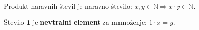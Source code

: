 \begin{frame}
\begin{block}{}
\begin{figure}
            \end{figure}

            \end{block}


            \begin{block}{}
                Produkt naravnih števil je naravno število: $x, y \in \mathbb{N} \Rightarrow x\cdot y \in \mathbb{N}$.

            \end{block}

            \begin{block}{}
                Število $\mathbf{1}$ je \textbf{nevtralni element} za mmnoženje: $1\cdot x = y$.
            \end{block}

        \end{frame}

